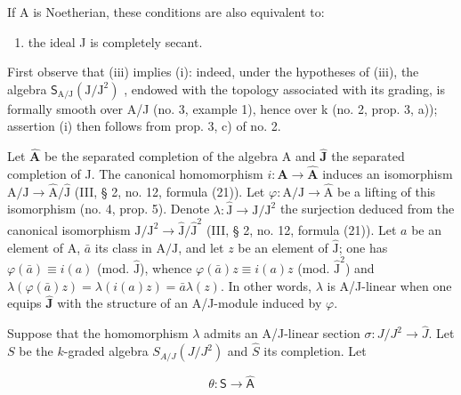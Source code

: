 If A is Noetherian, these conditions are also equivalent to:

\begin{enumerate}
\def\labelenumi{(\roman{enumi})}
\setcounter{enumi}{3}
\tightlist
\item
  the ideal J is completely secant.
\end{enumerate}

First observe that (iii) implies (i): indeed, under the hypotheses of (iii), the algebra \(\mathsf{S}_{\mathrm{A}/\mathrm{J}}(\mathrm{J}/\mathrm{J}^{2})\) , endowed with the topology associated with its grading, is formally smooth over A/J (no. 3, example 1), hence over k (no. 2, prop. 3, a)); assertion (i) then follows from prop. 3, c) of no. 2.

Let \(\widehat{\mathbf{A}}\) be the separated completion of the algebra A and \(\widehat{\mathbf{J}}\) the separated completion of J. The canonical homomorphism \(i: \mathbf{A} \to \widehat{\mathbf{A}}\) induces an isomorphism \(\mathrm{A} / \mathrm{J} \longrightarrow \widehat{\mathrm{A}} / \widehat{\mathrm{J}}\) (III, § 2, no. 12, formula (21)). Let \(\varphi: \mathrm{A} / \mathrm{J} \to \widehat{\mathrm{A}}\) be a lifting of this isomorphism (no. 4, prop. 5). Denote \(\lambda: \widehat{\mathrm{J}} \to \mathrm{J} / \mathrm{J}^2\) the surjection deduced from the canonical isomorphism \(\mathrm{J} / \mathrm{J}^2 \longrightarrow \widehat{\mathrm{J}} / \widehat{\mathrm{J}}^2\) (III, § 2, no. 12, formula (21)). Let \(a\) be an element of A, \(\bar{a}\) its class in \(\mathrm{A} / \mathrm{J}\), and let \(z\) be an element of \(\widehat{\mathrm{J}}\); one has \(\varphi(\bar{a}) \equiv i(a)\) (mod. \(\widehat{\mathrm{J}}\)), whence \(\varphi(\bar{a})z \equiv i(a)z\) (mod. \(\widehat{\mathrm{J}}^2\)) and \(\lambda(\varphi(\bar{a})z) = \lambda(i(a)z) = \bar{a}\lambda(z)\). In other words, \(\lambda\) is A/J-linear when one equips \(\widehat{\mathbf{J}}\) with the structure of an A/J-module induced by \(\varphi\).

Suppose that the homomorphism \(\lambda\) admits an A/J-linear section \(\sigma : J/J^{2} \longrightarrow \widehat{J}\). Let \(S\) be the \(k\)-graded algebra \(S_{A/J}(J/J^{2})\) and \(\widehat{S}\) its completion. Let

\[
\theta : \mathsf {S} \to \widehat {\mathsf {A}}
\]

